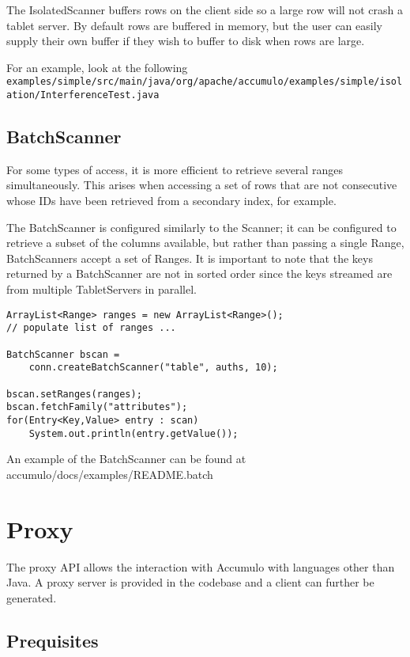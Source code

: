 The IsolatedScanner buffers rows on the client side so a large row will not
crash a tablet server. By default rows are buffered in memory, but the user
can easily supply their own buffer if they wish to buffer to disk when rows are
large.

For an example, look at the following\\
\texttt{examples/simple/src/main/java/org/apache/accumulo/examples/simple/isolation/InterferenceTest.java}

\subsection{BatchScanner}

For some types of access, it is more efficient to retrieve several ranges
simultaneously. This arises when accessing a set of rows that are not consecutive
whose IDs have been retrieved from a secondary index, for example.

The BatchScanner is configured similarly to the Scanner; it can be configured to
retrieve a subset of the columns available, but rather than passing a single Range,
BatchScanners accept a set of Ranges. It is important to note that the keys returned
by a BatchScanner are not in sorted order since the keys streamed are from multiple
TabletServers in parallel.

\small
\begin{verbatim}
ArrayList<Range> ranges = new ArrayList<Range>();
// populate list of ranges ...

BatchScanner bscan =
    conn.createBatchScanner("table", auths, 10);

bscan.setRanges(ranges);
bscan.fetchFamily("attributes");
for(Entry<Key,Value> entry : scan)
    System.out.println(entry.getValue());
\end{verbatim}
\normalsize

An example of the BatchScanner can be found at\\
accumulo/docs/examples/README.batch

\section{Proxy}

The proxy API allows the interaction with Accumulo with languages other than Java.
A proxy server is provided in the codebase and a client can further be generated.

\subsection{Prequisites}

